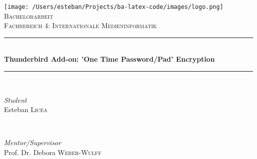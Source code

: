 
\begin{titlepage} %
	\newcommand{\HRule}{\rule{\linewidth}{0.5mm}} %
	
	\center %
	
	
		\texttt{[image: /Users/esteban/Projects/ba-latex-code/images/logo.png]}\\[1cm] %
	
	\textsc{\Large Bachelorarbeit}\\[0.5cm] %
	
	\textsc{\large Fachbereich 4: Internationale Medieninformatik}\\[0.5cm] %
	
	
	\HRule\\[0.4cm]
	
	{\huge\bfseries Thunderbird Add-on: 'One Time Password/Pad' Encryption}\\[0.4cm] %
	
	\HRule\\[1.5cm]
	
	
	\begin{minipage}{0.4\textwidth}
		\begin{flushleft}
			\large
			\textit{Student}\\
			Esteban \textsc{Licea} %
		\end{flushleft}
	\end{minipage}
	~
	\begin{minipage}{0.4\textwidth}
		\begin{flushright}
			\large
			\textit{Mentor/Supervisor}\\
			Prof. Dr. Debora \textsc{Weber-Wulff} %
		\end{flushright}
	\end{minipage}
	

\end{titlepage}
